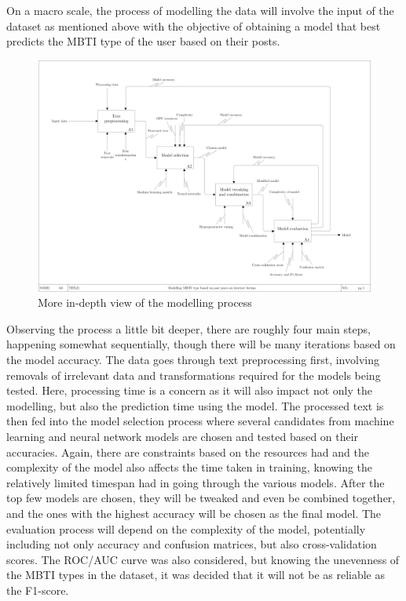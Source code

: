 \documentclass[11pt,a4paper]{article}
\begin{document}
	On a macro scale, the process of modelling the data will involve the input of the dataset as mentioned above with the objective of obtaining a model that best predicts the MBTI type of the user based on their posts.
	
	\begin{figure}[h!]
		\centering
		
		\includegraphics[width=\textwidth]{img/CDS}
		
		\caption{More in-depth view of the modelling process}
		
	\end{figure}
	
	Observing the process a little bit deeper, there are roughly four main steps, happening somewhat sequentially, though there will be many iterations based on the model accuracy. The data goes through text preprocessing first, involving removals of irrelevant data and transformations required for the models being tested. Here, processing time is a concern as it will also impact not only the modelling, but also the prediction time using the model. The processed text is then fed into the model selection process where several candidates from machine learning and neural network models are chosen and tested based on their accuracies. Again, there are constraints based on the resources had and the complexity of the model also affects the time taken in training, knowing the relatively limited timespan had in going through the various models. After the top few models are chosen, they will be tweaked and even be combined together, and the ones with the highest accuracy will be chosen as the final model. The evaluation process will depend on the complexity of the model, potentially including not only accuracy and confusion matrices, but also cross-validation scores. The ROC/AUC curve was also considered, but knowing the unevenness of the MBTI types in the dataset, it was decided that it will not be as reliable as the F1-score.\autocite{MachineLearningF1}
	
\end{document}
